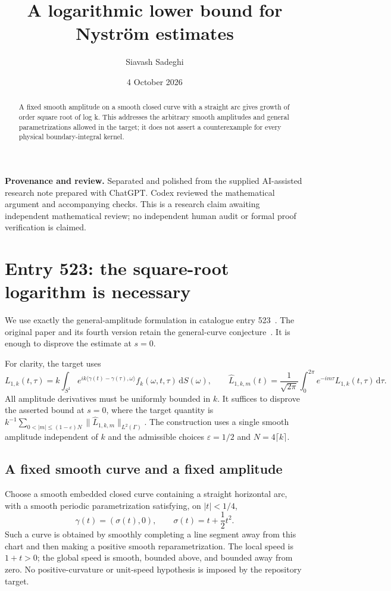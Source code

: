 \documentclass[11pt,a4paper]{article}
\theoremstyle{remark}
\newcommand{\eps}{\varepsilon}
\begin{document}
\title{A logarithmic lower bound for Nystr\"om estimates}
\author{Siavash Sadeghi}
\date{4 October 2026}
\maketitle
\begin{abstract}
A fixed smooth amplitude on a smooth closed curve with a straight arc gives growth of order square root of log k. This addresses the arbitrary smooth amplitudes and general parametrizations allowed in the target; it does not assert a counterexample for every physical boundary-integral kernel.
\end{abstract}
\textbf{Provenance and review.} Separated and polished from the supplied AI-assisted research note prepared with ChatGPT. Codex reviewed the mathematical argument and accompanying checks. This is a research claim awaiting independent mathematical review; no independent human audit or formal proof verification is claimed.
\medskip
\section{Entry 523: the square-root logarithm is necessary}\label{sec:nystrom}

We use exactly the general-amplitude formulation in catalogue entry 523~\cite{repo523}. The original paper and its fourth version retain the general-curve conjecture~\cite{galkowski}. It is enough to disprove the estimate at $s=0$.

For clarity, the target uses
\[
 L_{1,k}(t,\tau)=k\int_{S^1}e^{ik\langle\gamma(t)-\gamma(\tau),\omega\rangle}
 f_k(\omega,t,\tau)\,\mathrm dS(\omega),\qquad
 \widehat L_{1,k,m}(t)=\frac1{\sqrt{2\pi}}\int_0^{2\pi}e^{-im\tau}L_{1,k}(t,\tau)\,\mathrm d\tau.
\]
All amplitude derivatives must be uniformly bounded in $k$. It suffices to
disprove the asserted bound at $s=0$, where the target quantity is
$k^{-1}\sum_{0<|m|\le(1-\eps)N}\|\widehat L_{1,k,m}\|_{L^2(\Gamma)}$.
The construction uses a single smooth amplitude independent of $k$ and the
admissible choices $\eps=1/2$ and $N=4\lceil k\rceil$.

\subsection{A fixed smooth curve and a fixed amplitude}

Choose a smooth embedded closed curve containing a straight horizontal arc, with a smooth periodic parametrization satisfying, on $|t|<1/4$,
\begin{equation}\label{eq:localcurve}
 \gamma(t)=(\sigma(t),0),\qquad \sigma(t)=t+\frac12t^2.
\end{equation}
Such a curve is obtained by smoothly completing a line segment away from this chart and then making a positive smooth reparametrization. The local speed is $1+t>0$; the global speed is smooth, bounded above, and bounded away from zero. No positive-curvature or unit-speed hypothesis is imposed by the repository target.
\end{document}
